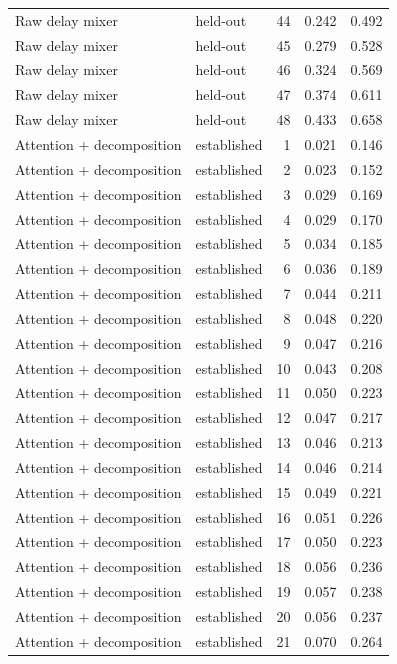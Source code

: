 \begin{tabular}{llrrr}
Raw delay mixer & held-out & 44 & 0.242 & 0.492 \\
Raw delay mixer & held-out & 45 & 0.279 & 0.528 \\
Raw delay mixer & held-out & 46 & 0.324 & 0.569 \\
Raw delay mixer & held-out & 47 & 0.374 & 0.611 \\
Raw delay mixer & held-out & 48 & 0.433 & 0.658 \\
Attention + decomposition & established & 1 & 0.021 & 0.146 \\
Attention + decomposition & established & 2 & 0.023 & 0.152 \\
Attention + decomposition & established & 3 & 0.029 & 0.169 \\
Attention + decomposition & established & 4 & 0.029 & 0.170 \\
Attention + decomposition & established & 5 & 0.034 & 0.185 \\
Attention + decomposition & established & 6 & 0.036 & 0.189 \\
Attention + decomposition & established & 7 & 0.044 & 0.211 \\
Attention + decomposition & established & 8 & 0.048 & 0.220 \\
Attention + decomposition & established & 9 & 0.047 & 0.216 \\
Attention + decomposition & established & 10 & 0.043 & 0.208 \\
Attention + decomposition & established & 11 & 0.050 & 0.223 \\
Attention + decomposition & established & 12 & 0.047 & 0.217 \\
Attention + decomposition & established & 13 & 0.046 & 0.213 \\
Attention + decomposition & established & 14 & 0.046 & 0.214 \\
Attention + decomposition & established & 15 & 0.049 & 0.221 \\
Attention + decomposition & established & 16 & 0.051 & 0.226 \\
Attention + decomposition & established & 17 & 0.050 & 0.223 \\
Attention + decomposition & established & 18 & 0.056 & 0.236 \\
Attention + decomposition & established & 19 & 0.057 & 0.238 \\
Attention + decomposition & established & 20 & 0.056 & 0.237 \\
Attention + decomposition & established & 21 & 0.070 & 0.264 \\

\end{tabular}
